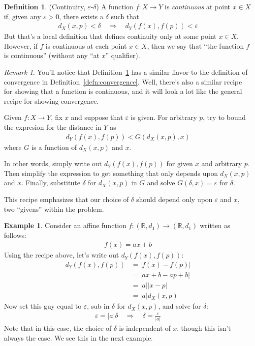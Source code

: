 \documentclass[12pt]{book}
\numberwithin{equation}{section} %
\theoremstyle{plain}
\theoremstyle{definition}
\newtheorem{defn}[thm]{Definition}
\newtheorem{ex}[thm]{Example}
\theoremstyle{remark}
\newtheorem*{rmk}{Remark}
\newcommand{\R}{\mathbb{R}}
\begin{document}
\begin{defn}{(Continuity, $\varepsilon$-$\delta$)}
\label{defn:cts}
A function $f:X\rightarrow Y$ is \emph{continuous} at point $x\in X$ if,
given any $\varepsilon>0$, there exists a $\delta$ such that
\begin{align*}
  d_X(x,p) < \delta \quad \Rightarrow\quad
  d_Y(f(x),f(p))<\varepsilon
\end{align*}
But that's a local definition that defines continuity only at some point
$x\in X$. However, if $f$ is continuous at each point $x\in X$, then we
say that ``the function $f$ is continuous'' (without any ``at $x$''
qualifier).
\end{defn}

\begin{rmk}
You'll notice that Definition~\ref{defn:cts} has a similar flavor to the
definition of convergence in Definition~\ref{defn:convergence}. Well,
there's also a similar recipe for showing that a function is continuous,
and it will look a lot like the general recipe for showing convergence.

Given $f:X\rightarrow Y$, fix $x$ and suppose that $\varepsilon$ is
given. For arbitrary $p$, try to bound the expresion for the distance in
$Y$ as
\begin{align*}
  d_Y(f(x), f(p)) < G\left(d_X(x,p), x\right)
\end{align*}
where $G$ is a function of $d_X(x,p)$ and $x$.

In other words, simply write out $d_Y(f(x),f(p))$ for given $x$ and
arbitrary $p$.  Then simplify the expression to get something that only
depends upon $d_X(x,p)$ and $x$. Finally, substitute $\delta$ for
$d_X(x,p)$ in $G$ and solve $G(\delta,x)=\varepsilon$ for $\delta$.

This recipe emphasizes that our choice of $\delta$ should depend only
upon $\varepsilon$ and $x$, two ``givens'' within the problem.
\end{rmk}

\begin{ex}
Consider an affine function $f:(\R,d_1) \rightarrow
(\R,d_1)$ written as follows:
\begin{align*}
  f(x) = ax + b
\end{align*}
Using the recipe above, let's write out $d_Y(f(x),f(p))$:
\begin{align*}
  d_Y(f(x),f(p))
  &= |f(x)-f(p)|\\
  &= |ax+b-ap+b|\\
  &= |a||x-p|\\
  &= |a|d_X(x,p)
\end{align*}
Now set this guy equal to $\varepsilon$, sub in $\delta$ for $d_X(x,p)$,
and solve for $\delta$:
\begin{align*}
  \varepsilon = |a| \delta
  \quad \Rightarrow\quad
  \delta = \frac{\varepsilon}{|a|}
\end{align*}
Note that in this case, the choice of $\delta$ is independent of $x$,
though this isn't always the case. We see this in the next example.
\end{ex}
\end{document}
